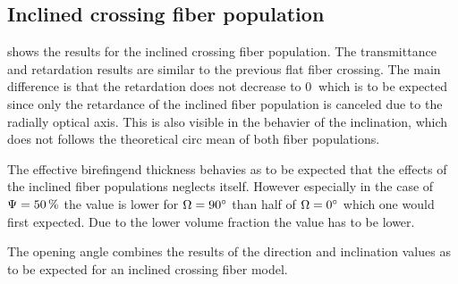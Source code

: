 \subsection{Inclined crossing fiber population}
 shows the results for the inclined crossing fiber population.
The transmittance and retardation results are similar to the previous flat fiber crossing.
The main difference is that the retardation does not decrease to $\SI{0}{}$ which is to be expected since only the retardance of the inclined fiber population is canceled due to the radially optical axis.
This is also visible in the behavier of the inclination, which does not follows the theoretical circ mean of both fiber populations.
\par
% 
The effective birefingend thickness \trel{} behavies as to be expected that the effects of the inclined fiber populations neglects itself.
However especially in the case of $\textnormal{$\Psi$}=\SI{50}{\percent}$ the \trel{} value is lower for $\textnormal{$\Omega$}=\SI{90}{\degree}$ than half of $\textnormal{$\Omega$}=\SI{0}{\degree}$ which one would first expected.
Due to the lower volume fraction the \trel{} value has to be lower.
\par
%
The opening angle \openingAngle{} combines the results of the direction and inclination values as to be expected for an inclined crossing fiber model.
% 
%
%
